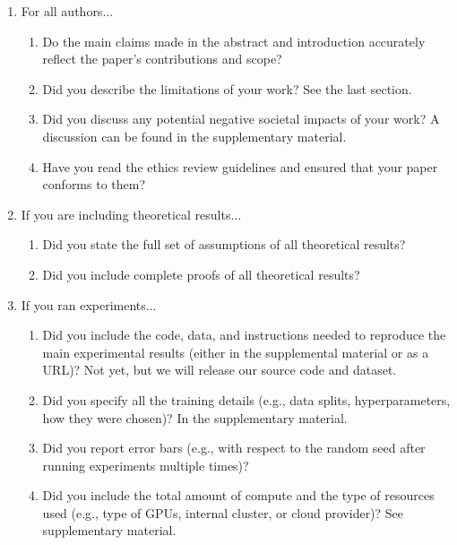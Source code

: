 \documentclass{article}
\begin{document}
\begin{enumerate}


\item For all authors...
\begin{enumerate}
  \item Do the main claims made in the abstract and introduction accurately reflect the paper's contributions and scope?
    \answerYes{}{}
  \item Did you describe the limitations of your work?
    \answerYes{} See the last section.
  \item Did you discuss any potential negative societal impacts of your work?
    \answerYes{} A discussion can be found in the supplementary material.
  \item Have you read the ethics review guidelines and ensured that your paper conforms to them?
    \answerYes{}
\end{enumerate}


\item If you are including theoretical results...
\begin{enumerate}
  \item Did you state the full set of assumptions of all theoretical results?
    \answerYes{}{}
        \item Did you include complete proofs of all theoretical results?
    \answerYes{}
\end{enumerate}


\item If you ran experiments...
\begin{enumerate}
  \item Did you include the code, data, and instructions needed to reproduce the main experimental results (either in the supplemental material or as a URL)?
    \answerNo{} Not yet, but we will release our source code and dataset.
  \item Did you specify all the training details (e.g., data splits, hyperparameters, how they were chosen)?
    \answerYes{} In the supplementary material.
        \item Did you report error bars (e.g., with respect to the random seed after running experiments multiple times)?
    \answerNo{}
        \item Did you include the total amount of compute and the type of resources used (e.g., type of GPUs, internal cluster, or cloud provider)?
    \answerYes{} See supplementary material.
\end{enumerate}



\end{enumerate}
\end{document}
